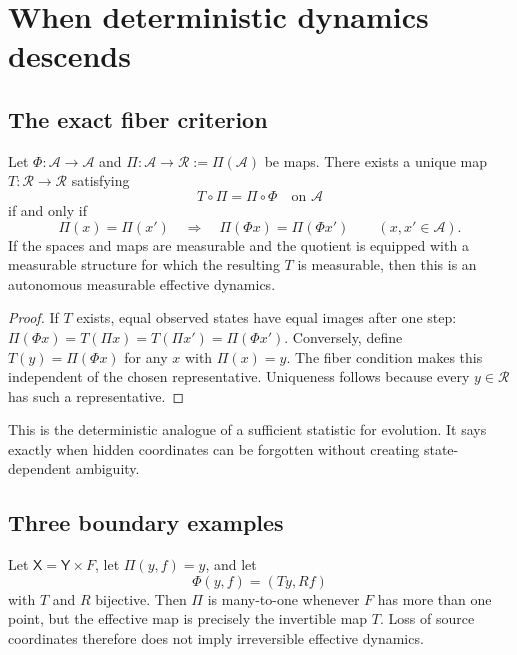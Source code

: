 \documentclass[11pt]{article}
\newcommand{\X}{\mathsf X}
\newcommand{\Y}{\mathsf Y}
\newcommand{\A}{\mathcal A}
\newcommand{\Rset}{\mathcal R}
\begin{document}
\section{When deterministic dynamics descends}

\subsection{The exact fiber criterion}

\begin{theorem}\label{thm:fiber}
Let $\Phi:\A\to\A$ and $\Pi:\A\to\Rset:=\Pi(\A)$ be maps.  There exists a
unique map $T:\Rset\to\Rset$ satisfying
\[
  T\circ\Pi=\Pi\circ\Phi
  \quad\text{on }\A
\]
if and only if
\[
  \Pi(x)=\Pi(x')
  \quad\Longrightarrow\quad
  \Pi(\Phi x)=\Pi(\Phi x')
  \qquad (x,x'\in\A).
\]
If the spaces and maps are measurable and the quotient is equipped with a
measurable structure for which the resulting $T$ is measurable, then this
is an autonomous measurable effective dynamics.
\end{theorem}

\begin{proof}
If $T$ exists, equal observed states have equal images after one step:
$\Pi(\Phi x)=T(\Pi x)=T(\Pi x')=\Pi(\Phi x')$.  Conversely, define
$T(y)=\Pi(\Phi x)$ for any $x$ with $\Pi(x)=y$.  The fiber condition makes
this independent of the chosen representative.  Uniqueness follows because
every $y\in\Rset$ has such a representative.
\end{proof}

This is the deterministic analogue of a sufficient statistic for evolution.
It says exactly when hidden coordinates can be forgotten without creating
state-dependent ambiguity.

\subsection{Three boundary examples}

\begin{example}\label{ex:product}
Let $\X=\Y\times F$, let $\Pi(y,f)=y$, and let
\[
  \Phi(y,f)=(Ty,Rf)
\]
with $T$ and $R$ bijective.  Then $\Pi$ is many-to-one whenever $F$ has more
than one point, but the effective map is precisely the invertible map $T$.
Loss of source coordinates therefore does not imply irreversible effective
dynamics.
\end{example}
\end{document}
